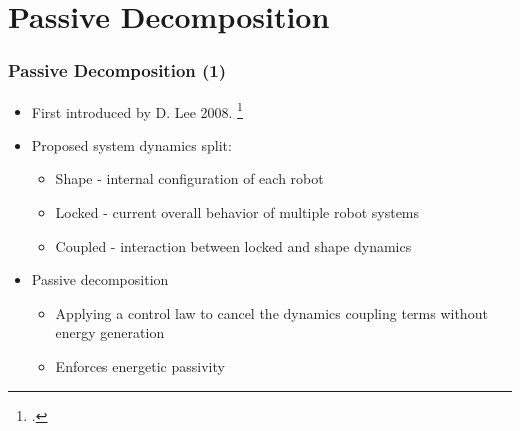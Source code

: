 \section{Passive Decomposition}

\begin{frame}
	\frametitle{Passive Decomposition (1)}
	
	\begin{itemize}
		\item First introduced by D. Lee 2008. \footcite{LeePassive}
		\item Proposed system dynamics split:
		\begin{itemize}
			\item Shape	- internal configuration of each robot
			\item Locked - current overall behavior of multiple robot systems 
			\item Coupled - interaction between locked and shape dynamics
		\end{itemize}
		\item Passive decomposition
		\begin{itemize}
			\item Applying a control law to cancel the dynamics coupling terms without energy generation
			\item Enforces energetic passivity
		\end{itemize}
	\end{itemize}
\end{frame}